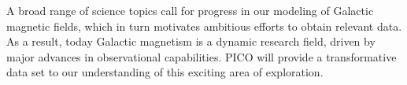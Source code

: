 \documentclass[PICOReport.tex]{subfiles}
\begin{document}
A broad range of science topics call for progress in our modeling of Galactic magnetic fields, which in turn motivates ambitious efforts to obtain relevant data. As a result, today Galactic magnetism is a dynamic research field, driven by major advances in observational capabilities. PICO will provide a transformative data set to our understanding of this exciting area of exploration.
\end{document}
